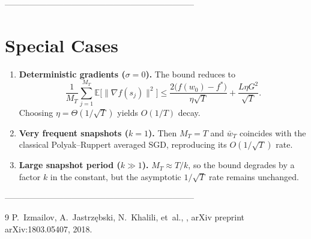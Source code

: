 \documentclass{article}
\newcommand{\E}{\mathbb{E}}
\begin{document}
--------------------------------------------------------------------

\section*{Special Cases}
\begin{enumerate}
\item \textbf{Deterministic gradients ($\sigma=0$).}
The bound reduces to
\[
\frac{1}{M_T}\sum_{j=1}^{M_T}\E\!\big[\|\nabla f(s_j)\|^{2}\big]
\le
\frac{2\big(f(w_0)-f^{*}\big)}{\eta\sqrt{T}}
+\frac{L\eta G^{2}}{\sqrt{T}}.
\]
Choosing $\eta= \Theta(1/\sqrt{T})$ yields $O(1/T)$ decay.

\item \textbf{Very frequent snapshots ($k=1$).}
Then $M_T=T$ and $\bar w_T$ coincides with the classical Polyak–Ruppert
averaged SGD, reproducing its $O(1/\sqrt{T})$ rate.

\item \textbf{Large snapshot period ($k\gg1$).}
$M_T\approx T/k$, so the bound degrades by a factor $k$ in the constant,
but the asymptotic $1/\sqrt{T}$ rate remains unchanged.
\end{enumerate}

--------------------------------------------------------------------

\begin{thebibliography}{9}
P.~Izmailov, A.~Jastrzębski, N.~Khalili, et~al.,
,
\newblock arXiv preprint arXiv:1803.05407, 2018.
\end{thebibliography}
\end{document}

